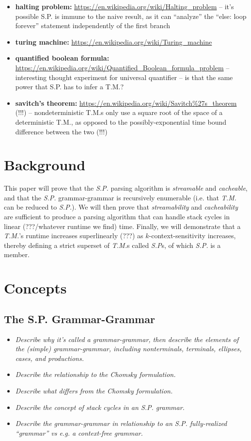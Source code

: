 \documentclass{article}
\begin{document}
\begin{itemize}
  \item \textbf{halting problem:} \url{https://en.wikipedia.org/wiki/Halting\_problem} -- it's possible S.P. is immune to the naive result, as it can ``analyze'' the ``else: loop forever'' statement independently of the first branch
  \item \textbf{turing machine:} \url{https://en.wikipedia.org/wiki/Turing\_machine}
  \item \textbf{quantified boolean formula:} \url{https://en.wikipedia.org/wiki/Quantified\_Boolean\_formula\_problem} -- interesting thought experiment for universal quantifier -- is that the same power that S.P. has to infer a T.M.?
  \item \textbf{savitch's theorem:} \url{https://en.wikipedia.org/wiki/Savitch\%27s\_theorem} (!!!) -- nondeterministic T.M.s only use a square root of the space of a deterministic T.M., as opposed to the possibly-exponential time bound difference between the two (!!!)
\end{itemize}

\section{Background}
This paper will prove that the \textit{S.P.} parsing algorithm is \textit{streamable} and \textit{cacheable}, and that the \textit{S.P.} grammar-grammar is recursively enumerable (i.e. that \textit{T.M.} can be reduced to \textit{S.P.}). We will then prove that \textit{streamability} and \textit{cacheability} are sufficient to produce a parsing algorithm that can handle stack cycles in linear (???/whatever runtime we find) time. Finally, we will demonstrate that a \textit{T.M.}'s runtime increases superlinearly (???) as $k$-context-sensitivity increases, thereby defining a strict superset of \textit{T.M.}s called \textit{S.P}s, of which \textit{S.P.} is a member.

\section{Concepts}
\subsection{The S.P. Grammar-Grammar}
\begin{itemize}
  \item \textit{Describe why it's called a grammar-grammar, then describe the elements of the (simple) grammar-grammar, including nonterminals, terminals, ellipses, cases, and productions.}
  \item \textit{Describe the relationship to the Chomsky formulation.}
  \item \textit{Describe what differs from the Chomsky formulation.}
  \item \textit{Describe the concept of stack cycles in an S.P. grammar.}
  \item \textit{Describe the grammar-grammar in relationship to an S.P. fully-realized ``grammar'' vs e.g. a context-free grammar.}
\end{itemize}
\end{document}
